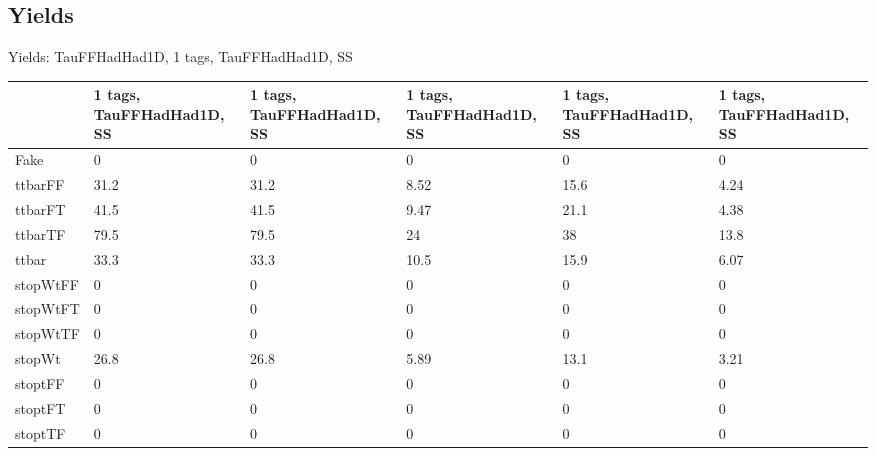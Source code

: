 
\subsection{Yields}

\begin{frame}{Yields: TauFFHadHad1D, 1 tags, TauFFHadHad1D, SS}
\begin{center}
  \begin{tabular}{l| >{\centering\let\newline\\\arraybackslash\hspace{0pt}}m{1.4cm}| >{\centering\let\newline\\\arraybackslash\hspace{0pt}}m{1.4cm}| >{\centering\let\newline\\\arraybackslash\hspace{0pt}}m{1.4cm}| >{\centering\let\newline\\\arraybackslash\hspace{0pt}}m{1.4cm}| >{\centering\let\newline\\\arraybackslash\hspace{0pt}}m{1.4cm}}
    & 1 tags, TauFFHadHad1D, SS & 1 tags, TauFFHadHad1D, SS & 1 tags, TauFFHadHad1D, SS & 1 tags, TauFFHadHad1D, SS & 1 tags, TauFFHadHad1D, SS \\
 \hline \hline
    Fake& 0 & 0 & 0 & 0 & 0 \\
 \hline
    ttbarFF& 31.2 & 31.2 & 8.52 & 15.6 & 4.24 \\
 \hline
    ttbarFT& 41.5 & 41.5 & 9.47 & 21.1 & 4.38 \\
 \hline
    ttbarTF& 79.5 & 79.5 & 24 & 38 & 13.8 \\
 \hline
    ttbar& 33.3 & 33.3 & 10.5 & 15.9 & 6.07 \\
 \hline
    stopWtFF& 0 & 0 & 0 & 0 & 0 \\
 \hline
    stopWtFT& 0 & 0 & 0 & 0 & 0 \\
 \hline
    stopWtTF& 0 & 0 & 0 & 0 & 0 \\
 \hline
    stopWt& 26.8 & 26.8 & 5.89 & 13.1 & 3.21 \\
 \hline
    stoptFF& 0 & 0 & 0 & 0 & 0 \\
 \hline
    stoptFT& 0 & 0 & 0 & 0 & 0 \\
 \hline
    stoptTF& 0 & 0 & 0 & 0 & 0 \\

\end{tabular}
\end{center}
\end{frame}
